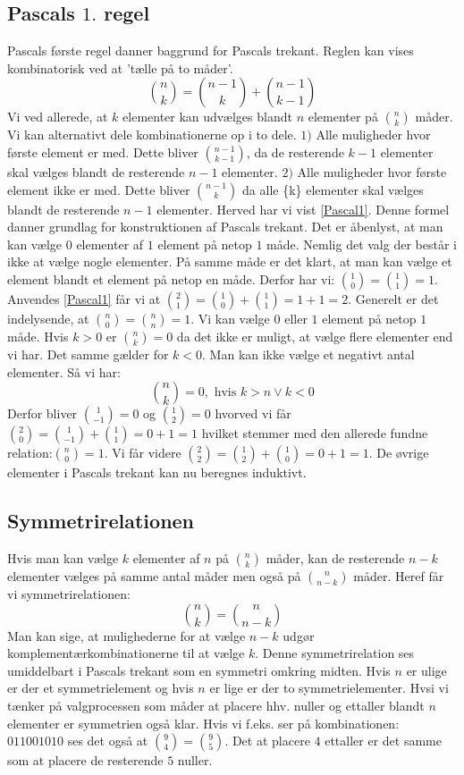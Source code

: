 \subsection{Pascals \(1.\) regel}
Pascals første regel danner baggrund for Pascals trekant. Reglen kan vises kombinatorisk ved at 'tælle på to måder'.
\begin{equation}
\binom{n}{k}=\binom{n-1}{k}+\binom{n-1}{k-1}\label{Pascal1}
\end{equation}
Vi ved allerede, at \(k\) elementer kan udvælges blandt \(n\) elementer på \(\binom{n}{k}\) måder.\\ Vi kan alternativt dele kombinationerne op i to dele. \(1)\) Alle muligheder hvor første element er med. Dette bliver \(\binom{n-1}{k-1}\), da de resterende \(k-1\) elementer skal vælges blandt de resterende \(n-1\) elementer. \(2)\) Alle muligheder hvor første element ikke er med. Dette bliver \(\binom{n-1}{k}\) da alle \{k\} elementer skal vælges blandt de resterende \(n-1\) elementer. Herved har vi vist \ref{Pascal1}. Denne formel danner grundlag for konstruktionen af Pascals trekant. Det er åbenlyst, at man kan vælge \(0\) elementer af \(1\) element på netop \(1\) måde. Nemlig det valg der består i ikke at vælge nogle elementer. På samme måde er det klart, at man kan vælge et element blandt et element på netop en måde. Derfor har vi: \(\binom{1}{0}=\binom{1}{1}=1\). Anvendes \ref{Pascal1} får vi at \(\binom{2}{1}=\binom{1}{0}+\binom{1}{1}=1+1=2\). Generelt er det indelysende, at \(\binom{n}{0}=\binom{n}{n}=1\). Vi kan vælge \(0\) eller \(1\) element på netop \(1\) måde. Hvis \(k>0\) er \(\binom{n}{k}=0\) da det ikke er muligt, at vælge flere elementer end vi har. Det samme gælder for \(k<0\). Man kan ikke vælge et negativt antal elementer. Så vi har:
\[\binom{n}{k}=0, \text{ hvis } k>n \vee k<0\]
Derfor bliver \(\binom{1}{-1}=0\) og \(\binom{1}{2}=0\) hvorved vi får \(\binom{2}{0}=\binom{1}{-1}+\binom{1}{1}=0+1=1\) hvilket stemmer med den allerede fundne relation:\(\binom{n}{0}=1\). Vi får videre \(\binom{2}{2}=\binom{1}{2}+\binom{1}{0}=0+1=1\). De øvrige elementer i Pascals trekant kan nu beregnes induktivt.
\subsection{Symmetrirelationen}
Hvis man kan vælge \(k\) elementer af \(n\) på \(\binom{n}{k}\) måder, kan de resterende \(n-k\) elementer vælges på samme antal måder men også på \(\binom{n}{n-k}\) måder. Heref får vi symmetrirelationen:
\begin{equation}
\binom{n}{k}=\binom{n}{n-k}
\end{equation}
Man kan sige, at mulighederne for at vælge \(n-k\) udgør komplementærkombinationerne til at vælge \(k\). Denne symmetrirelation ses umiddelbart i Pascals trekant som en symmetri omkring midten. Hvis \(n\) er ulige er der et symmetrielement og hvis \(n\) er lige er der to symmetrielementer. Hvsi vi tænker på valgprocessen som måder at placere hhv. nuller og ettaller blandt \(n\) elementer er symmetrien også klar. Hvis vi f.eks. ser på kombinationen: \(011001010\)
ses det også at \(\binom{9}{4}=\binom{9}{5}\). Det at placere \(4\) ettaller er det samme som at placere de resterende \(5\) nuller.
